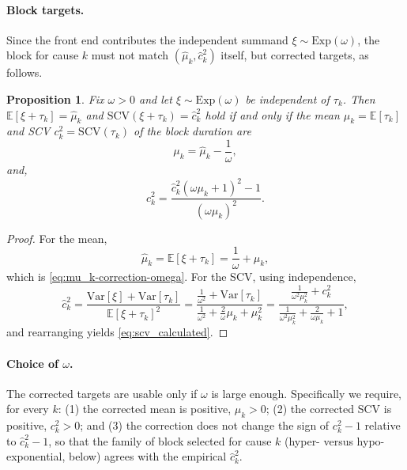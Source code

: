 \documentclass{article}
\newtheorem{proposition}{Proposition}
\newcommand{\EX}{\mathbb{E}}
\newcommand{\ex}[1]{\mathbb{E}\left[#1\right]}
\newcommand{\var}[1]{\mathrm{Var}\left[#1\right]}
\begin{document}
\paragraph{Block targets.} Since the front end contributes the independent summand $\xi \sim \mathrm{Exp}(\omega)$, the block for cause $k$ must not match $(\hat{\mu}_k, \hat{c}_k^2)$ itself, but corrected targets, as follows.

\begin{proposition}
\label{prop:init-correction}
Fix $\omega > 0$ and let $\xi \sim \mathrm{Exp}(\omega)$ be independent of $\tau_k$. Then $\ex{\xi + \tau_k} = \hat{\mu}_k$ and $\mathrm{SCV}(\xi+\tau_k) = \hat{c}_k^2$ hold if and only if the mean $\mu_k = \ex{\tau_k}$ and SCV $c_k^2 = \mathrm{SCV}(\tau_k)$ of the block duration are
\begin{equation}
\label{eq:mu_k-correction-omega}
    \mu_{k} = \hat{\mu}_{k} - \frac{1}{\omega},
\end{equation}
%
and,
%
\begin{equation}
\label{eq:scv_calculated}
    c_{k}^2 = \frac{\hat{c}_{k}^2(\omega \mu_{k}+1)^2-1}{(\omega \mu_{k})^2}.
\end{equation}
\end{proposition}
%
\begin{proof}
For the mean,
%
\[
\hat{\mu}_{k} = \EX[\xi+\tau_{k}] = \frac{1}{\omega}+\mu_k,
\]
%
which is \eqref{eq:mu_k-correction-omega}. For the SCV, using independence,
%
\[
\hat{c}^2_{k} = \frac{\var{\xi}+\var{\tau_{k}}}{\EX[\xi + \tau_k]^2}  =
\frac{\frac{1}{\omega^2}+\var{\tau_{k}}}{\frac{1}{\omega^2}+\frac{2}{\omega}\mu_k+\mu_k^2}
= \frac{\frac{1}{\omega^2 \mu_{k}^2}+c_{k}^2}{\frac{1}{\omega^2 \mu_{k}^2}+\frac{2}{\omega \mu_{k}}+1},
\]
%
and rearranging yields \eqref{eq:scv_calculated}.
\end{proof}

\paragraph{Choice of $\omega$.} The corrected targets are usable only if $\omega$ is large enough. Specifically we require, for every $k$: (1) the corrected mean is positive, $\mu_k > 0$; (2) the corrected SCV is positive, $c_k^2 > 0$; and (3) the correction does not change the sign of $c_k^2 - 1$ relative to $\hat{c}_k^2 - 1$, so that the family of block selected for cause $k$ (hyper- versus hypo-exponential, below) agrees with the empirical $\hat{c}_k^2$.
\end{document}
